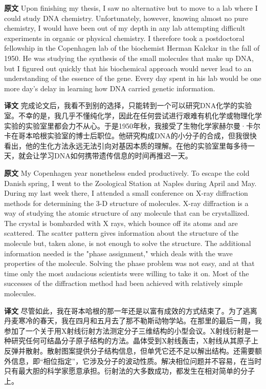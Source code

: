 \documentclass[UTF8,zihao=-4]{ctexart}
\newcommand{\BodyFont}{\fontsize{10.5pt}{15.5pt}\selectfont}
\renewenvironment{quote}{\par\noindent\begingroup\BodyFont}{\par\endgroup}
\begin{document}
\begin{quote}
\noindent\textbf{原文} Upon finishing my thesis, I saw no alternative but to move to a lab where I could study DNA chemistry. Unfortunately, however, knowing almost no pure chemistry, I would have been out of my depth in any lab attempting difficult experiments in organic or physical chemistry. I therefore took a postdoctoral fellowship in the Copenhagen lab of the biochemist Herman Kalckar in the fall of 1950. He was studying the synthesis of the small molecules that make up DNA, but I figured out quickly that his biochemical approach would never lead to an understanding of the essence of the gene. Every day spent in his lab would be one more day's delay in learning how DNA carried genetic information.

\smallskip
\noindent\textbf{译文} 完成论文后，我看不到别的选择，只能转到一个可以研究DNA化学的实验室。不幸的是，我几乎不懂纯化学，因此在任何尝试进行艰难有机化学或物理化学实验的实验室里都会力不从心。于是1950年秋，我接受了生物化学家赫尔曼·卡尔卡在哥本哈根实验室的博士后职位。他研究构成DNA的小分子的合成，但我很快看出，他的生化方法永远无法引向对基因本质的理解。在他的实验室里每多待一天，就会让学习DNA如何携带遗传信息的时间再推迟一天。
\end{quote}

\begin{quote}
\noindent\textbf{原文} My Copenhagen year nonetheless ended productively. To escape the cold Danish spring, I went to the Zoological Station at Naples during April and May. During my last week there, I attended a small conference on X-ray diffraction methods for determining the 3-D structure of molecules. X-ray diffraction is a way of studying the atomic structure of any molecule that can be crystallized. The crystal is bombarded with X rays, which bounce off its atoms and are scattered. The scatter pattern gives information about the structure of the molecule but, taken alone, is not enough to solve the structure. The additional information needed is the "phase assignment," which deals with the wave properties of the molecule. Solving the phase problem was not easy, and at that time only the most audacious scientists were willing to take it on. Most of the successes of the diffraction method had been achieved with relatively simple molecules.

\smallskip
\noindent\textbf{译文} 尽管如此，我在哥本哈根的那一年还是以富有成效的方式结束了。为了逃离丹麦寒冷的春天，我在四月和五月去了那不勒斯动物学站。在那里的最后一周，我参加了一个关于用X射线衍射方法测定分子三维结构的小型会议。X射线衍射是一种研究任何可结晶分子原子结构的方法。晶体受到X射线轰击，X射线从其原子上反弹并散射。散射图案提供分子结构信息，但单凭它还不足以解出结构。还需要额外信息，即“相位指定”，它涉及分子的波动性质。解决相位问题并不容易，在当时只有最大胆的科学家愿意承担。衍射法的大多数成功，都发生在相对简单的分子上。
\end{quote}
\end{document}
